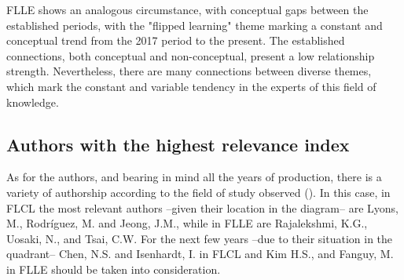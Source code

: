 \documentclass{textolivre-html}
\begin{document}
FLLE shows an analogous circumstance, with conceptual gaps between the established periods, with the "flipped learning" theme marking a constant and conceptual trend from the 2017 period to the present. The established connections, both conceptual and non-conceptual, present a low relationship strength. Nevertheless, there are many connections between diverse themes, which mark the constant and variable tendency in the experts of this field of knowledge.

\subsection{Authors with the highest relevance index}\label{sec-structural}
As for the authors, and bearing in mind all the years of production, there is a variety of authorship according to the field of study observed (). In this case, in FLCL the most relevant authors –given their location in the diagram– are Lyons, M., Rodríguez, M. and Jeong, J.M., while in FLLE are Rajalekshmi, K.G., Uosaki, N., and Tsai, C.W. For the next few years –due to their situation in the quadrant– Chen, N.S. and Isenhardt, I. in FLCL and Kim H.S., and Fanguy, M. in FLLE should be taken into consideration.
\end{document}
